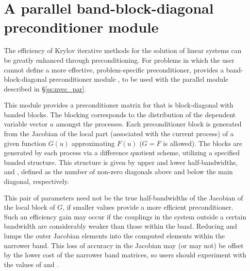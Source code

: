 \section{A parallel band-block-diagonal preconditioner module}
\label{sss:kinbbdpre}
The efficiency of Krylov iterative methods for the solution of linear systems 
can be greatly enhanced through preconditioning. For problems in which the 
user cannot define a more effective, problem-specific preconditioner,
{\kinsol} provides a band-block-diagonal preconditioner module {\kinbbdpre}, 
to be used with the parallel  module described in \S\ref{ss:nvec_par}.

This module provides a preconditioner matrix for {\kinsol} that
is block-diagonal with banded blocks. The blocking corresponds
to the distribution of the dependent variable vector $u$ amongst
the processes. Each preconditioner block is generated from
the Jacobian of the local part (associated with the current
process) of a given function $G(u)$ approximating $F(u)$
($G = F$ is allowed). The blocks are generated by each process via a
difference quotient scheme, utilizing a specified banded structure.
This structure is given by upper and lower half-bandwidths, 
and , defined as the number of non-zero diagonals above and
below the main diagonal, respectively.

This pair of parameters need not be the true half-bandwidths of the Jacobian
of the local block of $G$, if smaller values provide a more efficient
preconditioner.  Such an efficiency gain may occur if the couplings
in the system outside a certain bandwidth are considerably weaker than
those within the band.  Reducing  and  lumps the outer
Jacobian elements into the computed elements within the narrower band.
This loss of accuracy in the Jacobian may (or may not) be offset by
the lower cost of the narrower band matrices, so users should experiment
with the values of  and .

